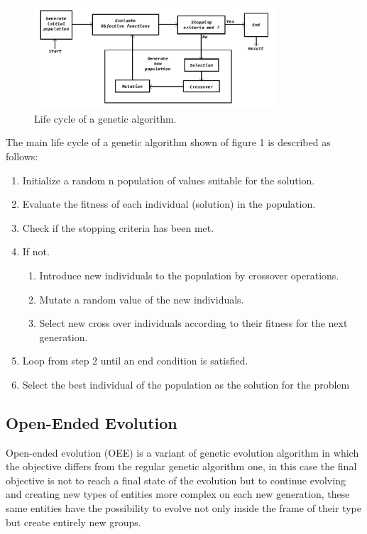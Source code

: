 \documentclass[graybox]{svmult}
\begin{document}
\begin{figure}[htbp]
\centerline{\includegraphics[width=90mm]{Images/ga_life_cycle.png}}
\caption{Life cycle of a genetic algorithm.}
\label{fig}
\end{figure}

The main life cycle of a genetic algorithm shown of figure 1 is described as follows:
\begin{enumerate}
    \item Initialize a random n population of values suitable for the solution.
    \item Evaluate the fitness of each individual (solution) in the population.
    \item Check if the stopping criteria has been met.
    \item If not.
    \begin{enumerate}
        \item Introduce new individuals to the population by crossover operations.
        \item Mutate a random value of the new individuals.
        \item Select new cross over individuals according to their fitness for the next generation.
    \end{enumerate}
    \item Loop from step 2 until an end condition is satisfied.
    \item Select the best individual of the population as the solution for the problem
\end{enumerate}


\subsection{Open-Ended Evolution}

Open-ended evolution (OEE) is a variant of genetic evolution algorithm in which the objective differs from the regular genetic algorithm one, in this case the final objective is not to reach a final state of the evolution but to continue evolving and creating new types of entities more complex on each new generation, these same entities have the possibility to evolve not only inside the frame of their type but create entirely new groups. \cite{Standish2003}
\end{document}
